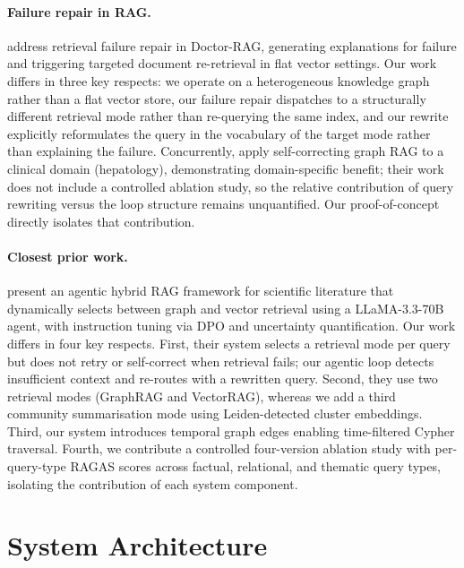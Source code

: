\documentclass[11pt]{article}
\begin{document}
\paragraph{Failure repair in RAG.}
\citet{jiao2026doctorrag} address retrieval failure repair in Doctor-RAG,
generating explanations for failure and triggering targeted document
re-retrieval in flat vector settings. Our work differs in three key
respects: we operate on a heterogeneous knowledge graph rather than a flat
vector store, our failure repair dispatches to a structurally different
retrieval mode rather than re-querying the same index, and our rewrite
explicitly reformulates the query in the vocabulary of the target mode
rather than explaining the failure. Concurrently, \citet{hu2025selfcorrecting}
apply self-correcting graph RAG to a clinical domain (hepatology), demonstrating
domain-specific benefit; their work does not include a controlled ablation
study, so the relative contribution of query rewriting versus the loop
structure remains unquantified. Our proof-of-concept directly isolates
that contribution.

\paragraph{Closest prior work.}
\citet{nagori2025opensource} present an agentic hybrid RAG framework for
scientific literature that dynamically selects between graph and vector
retrieval using a LLaMA-3.3-70B agent, with instruction tuning via DPO and
uncertainty quantification. Our work differs in four key respects. First,
their system selects a retrieval mode per query but does not retry or
self-correct when retrieval fails; our agentic loop detects insufficient
context and re-routes with a rewritten query. Second, they use two
retrieval modes (GraphRAG and VectorRAG), whereas we add a third community
summarisation mode using Leiden-detected cluster embeddings. Third, our
system introduces temporal graph edges enabling time-filtered Cypher
traversal. Fourth, we contribute a controlled four-version ablation study
with per-query-type RAGAS scores across factual, relational, and thematic
query types, isolating the contribution of each system component.

\section{System Architecture}
\label{sec:system}
\end{document}
